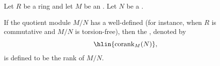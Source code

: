\begin{definition} \label{definition:corank_of_a_module_over_a_ring}
Let $R$ be a ring and let $M$ be an . Let $N$ be a .

If the quotient module $M/N$ has a well-defined  (for instance, when $R$ is commutative and $M/N$ is torsion-free), then the , denoted by
$$\hlin{\operatorname{corank}_M(N)},$$
is defined to be the rank of $M/N$.
\end{definition}
